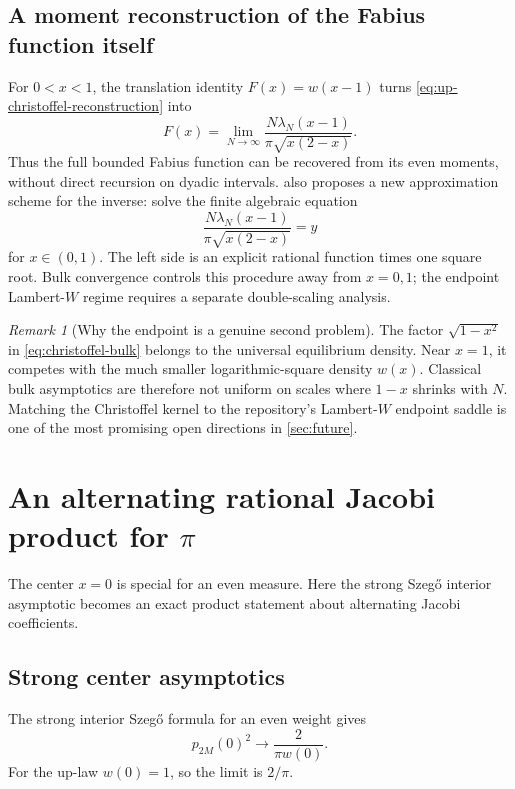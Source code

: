 \documentclass[11pt,oneside]{article}
\theoremstyle{definition}
\theoremstyle{remark}
\newtheorem{remark}[theorem]{Remark}
\numberwithin{equation}{section}
\begin{document}
\subsection{A moment reconstruction of the Fabius function itself}
For $0<x<1$, the translation identity $F(x)=w(x-1)$ turns
\cref{eq:up-christoffel-reconstruction} into
\begin{equation}
 \boxed{
 F(x)=\lim_{N\to\infty}
 \frac{N\lambda_N(x-1)}{\pi\sqrt{x(2-x)}}.}
 \label{eq:fabius-christoffel-reconstruction}
\end{equation}
Thus the full bounded Fabius function can be recovered from its even moments,
without direct recursion on dyadic intervals.  
also proposes a new approximation
scheme for the inverse: solve the finite algebraic equation
\begin{equation}
 \frac{N\lambda_N(x-1)}{\pi\sqrt{x(2-x)}}=y
 \label{eq:christoffel-inverse-approx}
\end{equation}
for $x\in(0,1)$.  The left side is an explicit rational function times one
square root.  Bulk convergence controls this procedure away from $x=0,1$;
the endpoint Lambert-$W$ regime requires a separate double-scaling analysis.

\begin{remark}[Why the endpoint is a genuine second problem]
The factor $\sqrt{1-x^2}$ in \cref{eq:christoffel-bulk} belongs to the
universal equilibrium density.  Near $x=1$, it competes with the much smaller
logarithmic-square density $w(x)$.  Classical bulk asymptotics are therefore
not uniform on scales where $1-x$ shrinks with $N$.  Matching the Christoffel
kernel to the repository's Lambert-$W$ endpoint saddle is one of the most
promising open directions in \cref{sec:future}.
\end{remark}

\section{An alternating rational Jacobi product for \texorpdfstring{$\pi$}{pi}}
\label{sec:pi-product}

The center $x=0$ is special for an even measure.  Here the strong Szeg\H{o}
interior asymptotic becomes an exact product statement about alternating
Jacobi coefficients.

\subsection{Strong center asymptotics}
The strong interior Szeg\H{o} formula for an even weight gives
\begin{equation}
 p_{2M}(0)^2\longrightarrow\frac{2}{\pi w(0)}.
 \label{eq:strong-center-general}
\end{equation}
For the up-law $w(0)=1$, so the limit is $2/\pi$.
\end{document}
